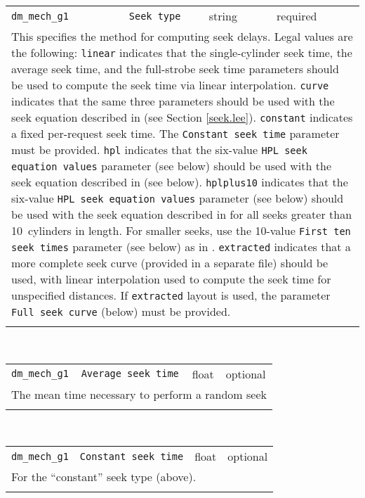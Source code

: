 \begin{tabular}{|p{\lpmodwidth}|p{\lpnamewidth}|p{0.5in}|p{0.5in}|}
\cline{1-4}
\texttt{dm\_mech\_g1} & \texttt{Seek type} & string & required \\ 
\cline{1-4}
\multicolumn{4}{|p{6in}|}{
This specifies the method for computing seek delays.
Legal values are the following:
\texttt{linear} indicates that the single-cylinder seek time, the average
seek time, and the full-strobe seek time parameters should be used to
compute the seek time via linear interpolation.
\texttt{curve} indicates that the same three parameters should be used
with the seek equation described in \cite{Lee93} (see Section
\ref{seek.lee}).
\texttt{constant} indicates a fixed per-request seek time. The
\texttt{Constant seek time} parameter must be provided.
\texttt{hpl} indicates that the six-value \texttt{HPL seek equation values}
parameter (see below) should be used with the seek equation described
in \cite{Ruemmler94} (see below).
\texttt{hplplus10} indicates that the six-value \texttt{HPL seek
equation values} parameter (see below) should be used with the seek
equation described in \cite{Ruemmler94} for all seeks greater than
10~cylinders in length. For smaller seeks, use the 10-value
\texttt{First ten seek times} parameter (see below) as in
\cite{Worthington94}.
\texttt{extracted} indicates that a more complete seek curve (provided
in a separate file) should be used, with linear interpolation used to
compute the seek time for unspecified distances. If
\texttt{extracted} layout is used, the parameter \texttt{Full seek curve}
(below) must be provided.
}\\ 
\cline{1-4}
\multicolumn{4}{p{5in}}{}\\
\end{tabular}\\ 
\noindent 
\begin{tabular}{|p{\lpmodwidth}|p{\lpnamewidth}|p{0.5in}|p{0.5in}|}
\cline{1-4}
\texttt{dm\_mech\_g1} & \texttt{Average seek time} & float & optional \\ 
\cline{1-4}
\multicolumn{4}{|p{6in}|}{
The mean time necessary to perform a random seek
}\\ 
\cline{1-4}
\multicolumn{4}{p{5in}}{}\\
\end{tabular}\\ 
\noindent 
\begin{tabular}{|p{\lpmodwidth}|p{\lpnamewidth}|p{0.5in}|p{0.5in}|}
\cline{1-4}
\texttt{dm\_mech\_g1} & \texttt{Constant seek time} & float & optional \\ 
\cline{1-4}
\multicolumn{4}{|p{6in}|}{
For the ``constant'' seek type (above).
}\\ 
\cline{1-4}
\multicolumn{4}{p{5in}}{}\\
\end{tabular}\\ 
